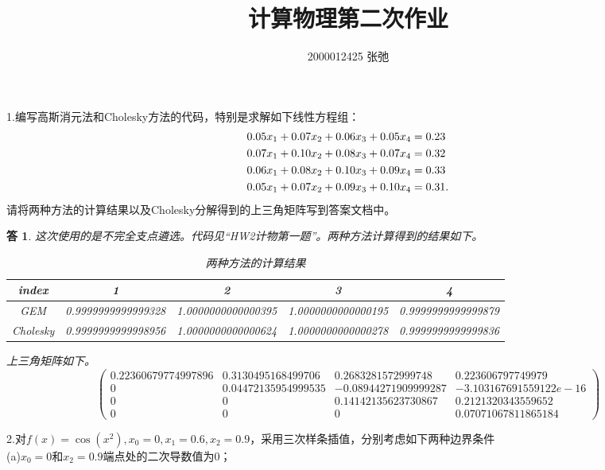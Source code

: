 \documentclass[10pt]{ctexart}
\author{2000012425 张弛}
\title{计算物理第二次作业}
\newtheorem*{answer}{答}
\begin{document}
\maketitle
1.编写高斯消元法和Cholesky方法的代码，特别是求解如下线性方程组：
\begin{align}
    0.05x_1+0.07x_2+0.06x_3+0.05x_4&=0.23\notag\\
    0.07x_1+0.10x_2+0.08x_3+0.07x_4&=0.32\notag\\
    0.06x_1+0.08x_2+0.10x_3+0.09x_4&=0.33\notag\\
    0.05x_1+0.07x_2+0.09x_3+0.10x_4&=0.31.\notag
\end{align}
请将两种方法的计算结果以及Cholesky分解得到的上三角矩阵写到答案文档中。
\begin{answer}
    这次使用的是不完全支点遴选。代码见“HW2计物第一题”。两种方法计算得到的结果如下。
    \begin{table}[H]
        \centering
        \begin{tabular}{ccccc}
            \toprule
            index & 1 & 2 & 3 & 4\\
            \midrule
            GEM & 0.9999999999999328 & 1.0000000000000395 & 1.0000000000000195 & 0.9999999999999879\\
            Cholesky & 0.9999999999998956 & 1.0000000000000624 & 1.0000000000000278 & 0.9999999999999836\\
            \bottomrule
        \end{tabular}
        \caption{两种方法的计算结果}
    \end{table}
    上三角矩阵如下。
    $$
    \begin{pmatrix}
        0.22360679774997896 & 0.3130495168499706 & 0.2683281572999748 & 0.223606797749979\\
        0 & 0.04472135954999535 & -0.08944271909999287 & -3.103167691559122e-16\\
        0 & 0 & 0.14142135623730867 & 0.2121320343559652\\
        0 & 0 & 0 & 0.07071067811865184
    \end{pmatrix}$$
\end{answer}
2.对$f(x)=\cos{(x^2)},x_0=0,x_1=0.6,x_2=0.9$，采用三次样条插值，分别考虑如下两种边界条件\\
(a)$x_0=0$和$x_2=0.9$端点处的二次导数值为$0$；
\end{document}
